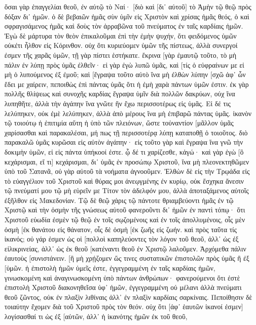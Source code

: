 ὅσαι γὰρ ἐπαγγελίαι θεοῦ, ἐν αὐτῷ τὸ Ναί· [διὸ καὶ [δι᾽ αὐτοῦ] τὸ Ἀμὴν τῷ θεῷ πρὸς δόξαν δι᾽ ἡμῶν. 
ὁ δὲ βεβαιῶν ἡμᾶς σὺν ὑμῖν εἰς Χριστὸν καὶ χρίσας ἡμᾶς θεός, 
ὁ καὶ σφραγισάμενος ἡμᾶς καὶ δοὺς τὸν ἀρραβῶνα τοῦ πνεύματος ἐν ταῖς καρδίαις ἡμῶν. 
Ἐγὼ δὲ μάρτυρα τὸν θεὸν ἐπικαλοῦμαι ἐπὶ τὴν ἐμὴν ψυχήν, ὅτι φειδόμενος ὑμῶν οὐκέτι ἦλθον εἰς Κόρινθον. 
οὐχ ὅτι κυριεύομεν ὑμῶν τῆς πίστεως, ἀλλὰ συνεργοί ἐσμεν τῆς χαρᾶς ὑμῶν, τῇ γὰρ πίστει ἑστήκατε. 
ἔκρινα [γὰρ ἐμαυτῷ τοῦτο, τὸ μὴ πάλιν ἐν λύπῃ πρὸς ὑμᾶς ἐλθεῖν· 
εἰ γὰρ ἐγὼ λυπῶ ὑμᾶς, καὶ [τίς ὁ εὐφραίνων με εἰ μὴ ὁ λυπούμενος ἐξ ἐμοῦ; 
καὶ [ἔγραψα τοῦτο αὐτὸ ἵνα μὴ ἐλθὼν λύπην [σχῶ ἀφ᾽ ὧν ἔδει με χαίρειν, πεποιθὼς ἐπὶ πάντας ὑμᾶς ὅτι ἡ ἐμὴ χαρὰ πάντων ὑμῶν ἐστιν. 
ἐκ γὰρ πολλῆς θλίψεως καὶ συνοχῆς καρδίας ἔγραψα ὑμῖν διὰ πολλῶν δακρύων, οὐχ ἵνα λυπηθῆτε, ἀλλὰ τὴν ἀγάπην ἵνα γνῶτε ἣν ἔχω περισσοτέρως εἰς ὑμᾶς. 
Εἰ δέ τις λελύπηκεν, οὐκ ἐμὲ λελύπηκεν, ἀλλὰ ἀπὸ μέρους ἵνα μὴ ἐπιβαρῶ πάντας ὑμᾶς. 
ἱκανὸν τῷ τοιούτῳ ἡ ἐπιτιμία αὕτη ἡ ὑπὸ τῶν πλειόνων, 
ὥστε τοὐναντίον [μᾶλλον ὑμᾶς χαρίσασθαι καὶ παρακαλέσαι, μή πως τῇ περισσοτέρᾳ λύπῃ καταποθῇ ὁ τοιοῦτος. 
διὸ παρακαλῶ ὑμᾶς κυρῶσαι εἰς αὐτὸν ἀγάπην· 
εἰς τοῦτο γὰρ καὶ ἔγραψα ἵνα γνῶ τὴν δοκιμὴν ὑμῶν, εἰ εἰς πάντα ὑπήκοοί ἐστε. 
ᾧ δέ τι χαρίζεσθε, κἀγώ· καὶ γὰρ ἐγὼ [ὃ κεχάρισμαι, εἴ τι] κεχάρισμαι, δι᾽ ὑμᾶς ἐν προσώπῳ Χριστοῦ, 
ἵνα μὴ πλεονεκτηθῶμεν ὑπὸ τοῦ Σατανᾶ, οὐ γὰρ αὐτοῦ τὰ νοήματα ἀγνοοῦμεν. 
Ἐλθὼν δὲ εἰς τὴν Τρῳάδα εἰς τὸ εὐαγγέλιον τοῦ Χριστοῦ καὶ θύρας μοι ἀνεῳγμένης ἐν κυρίῳ, 
οὐκ ἔσχηκα ἄνεσιν τῷ πνεύματί μου τῷ μὴ εὑρεῖν με Τίτον τὸν ἀδελφόν μου, ἀλλὰ ἀποταξάμενος αὐτοῖς ἐξῆλθον εἰς Μακεδονίαν. 
Τῷ δὲ θεῷ χάρις τῷ πάντοτε θριαμβεύοντι ἡμᾶς ἐν τῷ Χριστῷ καὶ τὴν ὀσμὴν τῆς γνώσεως αὐτοῦ φανεροῦντι δι᾽ ἡμῶν ἐν παντὶ τόπῳ· 
ὅτι Χριστοῦ εὐωδία ἐσμὲν τῷ θεῷ ἐν τοῖς σῳζομένοις καὶ ἐν τοῖς ἀπολλυμένοις, 
οἷς μὲν ὀσμὴ [ἐκ θανάτου εἰς θάνατον, οἷς δὲ ὀσμὴ [ἐκ ζωῆς εἰς ζωήν. καὶ πρὸς ταῦτα τίς ἱκανός; 
οὐ γάρ ἐσμεν ὡς οἱ [πολλοὶ καπηλεύοντες τὸν λόγον τοῦ θεοῦ, ἀλλ᾽ ὡς ἐξ εἰλικρινείας, ἀλλ᾽ ὡς ἐκ θεοῦ [κατέναντι θεοῦ ἐν Χριστῷ λαλοῦμεν. 
Ἀρχόμεθα πάλιν ἑαυτοὺς [συνιστάνειν. [ἢ μὴ χρῄζομεν ὥς τινες συστατικῶν ἐπιστολῶν πρὸς ὑμᾶς ἢ ἐξ [ὑμῶν. 
ἡ ἐπιστολὴ ἡμῶν ὑμεῖς ἐστε, ἐγγεγραμμένη ἐν ταῖς καρδίαις ἡμῶν, γινωσκομένη καὶ ἀναγινωσκομένη ὑπὸ πάντων ἀνθρώπων· 
φανερούμενοι ὅτι ἐστὲ ἐπιστολὴ Χριστοῦ διακονηθεῖσα ὑφ᾽ ἡμῶν, ἐγγεγραμμένη οὐ μέλανι ἀλλὰ πνεύματι θεοῦ ζῶντος, οὐκ ἐν πλαξὶν λιθίναις ἀλλ᾽ ἐν πλαξὶν καρδίαις σαρκίναις. 
Πεποίθησιν δὲ τοιαύτην ἔχομεν διὰ τοῦ Χριστοῦ πρὸς τὸν θεόν. 
οὐχ ὅτι [ἀφ᾽ ἑαυτῶν ἱκανοί ἐσμεν] λογίσασθαί τι ὡς ἐξ [αὑτῶν, ἀλλ᾽ ἡ ἱκανότης ἡμῶν ἐκ τοῦ θεοῦ, 
